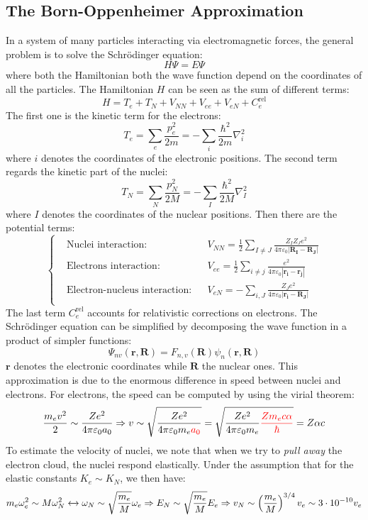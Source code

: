 \documentclass[10.75pt,a4paper,openright,bottom=2cm]{article}
\renewcommand{\Vec}[1]{\boldsymbol{#1}}
\begin{document}
\subsection{The Born-Oppenheimer Approximation}
In a system of many particles interacting via electromagnetic forces, the general problem is to solve the Schr\"odinger equation:
\[
H\Psi=E\Psi
\]
where both the Hamiltonian both the wave function depend on the coordinates of all the particles. The Hamiltonian $H$ can be seen as the sum of different terms:
\[
H=T_e+T_N+V_{NN}+V_{ee}+V_{eN}+C_e^{\text{rel}}
\]
The first one is the kinetic term for the electrons:
\[
T_e=\sum_e\frac{p_e^2}{2m}=-\sum_i\frac{\hbar^2}{2m}\nabla_i^2
\]
where $i$ denotes the coordinates of the electronic positions. The second term regards the kinetic part of the nuclei:
\[
T_N=\sum_N\frac{p_N^2}{2M}=-\sum_I\frac{\hbar^2}{2M}\nabla^2_I
\]
where $I$ denotes the coordinates of the nuclear positions. Then there are the potential terms:
\[
\left\{
\begin{aligned}
&\text{Nuclei interaction:} &&V_{NN}=\frac{1}{2}\sum_{I\neq J}\frac{Z_IZ_Je^2}{4\pi\varepsilon_0|\Vec{R_I}-\Vec{R_J}|}\\
&\text{Electrons interaction:} &&V_{ee}=\frac{1}{2}\sum_{i\neq j}\frac{e^2}{4\pi\varepsilon_0|\Vec{r_i}-\Vec{r_j}|}\\
&\text{Electron-nucleus interaction:} &&V_{eN}=-\sum_{i,J}\frac{Z_Je^2}{4\pi\varepsilon_0|\Vec{r_i}-\Vec{R_J}|}\\
\end{aligned}
\right.
\]
The last term $C_e^{\text{rel}}$ accounts for relativistic corrections on electrons. The Schr\"odinger equation can be simplified by decomposing the wave function in a product of simpler functions:
\[
\Psi_{nv}(\Vec{r},\Vec{R})=F_{n,v}(\Vec{R})\psi_n(\Vec{r},\Vec{R})
\]
$\Vec{r}$ denotes the electronic coordinates while $\Vec{R}$ the nuclear ones. This approximation is due to the enormous difference in speed between nuclei and electrons. For electrons, the speed can be computed by using the virial theorem:
\[
\frac{m_ev^2}{2}\sim\frac{Ze^2}{4\pi\varepsilon_0a_0}\Rightarrow v\sim\sqrt{\frac{Ze^2}{4\pi\varepsilon_0m_e{\color{red}{a_0}}}}=\sqrt{\frac{Ze^2}{4\pi\varepsilon_0m_e}{\color{red}{\frac{Zm_ec\alpha}{\hbar}}}}=Z\alpha c
\]
To estimate the velocity of nuclei, we note that when we try to \textit{pull away} the electron cloud, the nuclei respond elastically. Under the assumption that for the elastic constants $K_e\sim K_N$, we then have:
\[
m_e\omega_e^2\sim M\omega_N^2\xleftrightarrow[]{}\omega_N\sim\sqrt{\frac{m_e}{M}}\omega_e\Rightarrow E_N\sim\sqrt{\frac{m_e}{M}}E_e\Rightarrow v_N\sim\left(\frac{m_e}{M}\right)^{3/4}v_e\sim3\cdot10^{-10}v_e
\]
\end{document}
